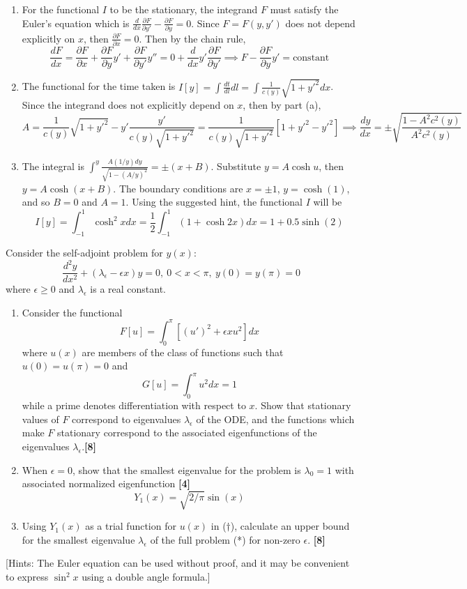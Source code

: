 \documentclass[a4paper]{article}
\begin{document}
\begin{ans}\leavevmode
\begin{enumerate}[label=(\alph*)]
\item For the functional $I$ to be the stationary, the integrand $F$ must satisfy the Euler's equation which is $\frac{d}{dx}\frac{\partial F}{\partial y'}-\frac{\partial F}{\partial y}=0$. Since $F=F(y,y')$ does not depend explicitly on $x$, then $\frac{\partial F}{\partial x}=0$. Then by the chain rule,
$$\frac{dF}{dx}=\frac{\partial F}{\partial x}+\frac{\partial F}{\partial y}y'+\frac{\partial F}{\partial y'}y''=0+\frac{d}{dx}y'\frac{\partial F}{\partial y'}\implies F-\frac{\partial F}{\partial y}y'=\text{constant}$$
\item The functional for the time taken is $I[y]=\int\frac{dt}{dl}dl=\int\frac{1}{c(y)}\sqrt{1+y'^2}dx$. Since the integrand does not explicitly depend on $x$, then by part (a),
$$A=\frac{1}{c(y)}\sqrt{1+y'^2}-y'\frac{y'}{c(y)\sqrt{1+y'^2}}=\frac{1}{c(y)\sqrt{1+y'^2}}[1+y'^2-y'^2]\implies\frac{dy}{dx}=\pm\sqrt{\frac{1-A^2c^2(y)}{A^2c^2(y)}}$$
\item The integral is $\int^y\frac{A(1/y)dy}{\sqrt{1-(A/y)^2}}=\pm(x+B)$.  Substitute $y=A\cosh u$, then $y=A\cosh(x+B)$. The boundary conditions are $x=\pm1$, $y=\cosh(1)$, and so $B=0$ and $A=1$. Using the suggested hint, the functional $I$ will be
$$I[y]=\int_{-1}^1\cosh^2xdx=\frac{1}{2}\int_{-1}^1(1+\cosh 2x)dx=1+0.5\sinh(2)$$
\end{enumerate}
\end{ans}
\newpage
\begin{qns}
Consider the self-adjoint problem for $y(x)$:
\begin{equation}
   \frac{d^2y}{dx^2}+(\lambda_\epsilon-\epsilon x)y=0,~0<x<\pi,~y(0)=y(\pi)=0\tag{*}
\end{equation}
where $\epsilon\geq0$ and $\lambda_\epsilon$ is a real constant.
\begin{enumerate}[label=(\alph*)]
\item Consider the functional
\begin{equation}F[u]=\int_0^\pi[(u')^2+\epsilon xu^2]dx\tag{\dag}
\end{equation}
where $u(x)$ are members of the class of functions such that $u(0)=u(\pi)=0$ and
$$G[u]=\int_0^\pi u^2dx=1$$
while a prime denotes differentiation with respect to $x$. Show that stationary values of $F$ correspond to eigenvalues $\lambda_\epsilon$ of the ODE, and the functions which make $F$ stationary correspond to the associated eigenfunctions of the eigenvalues $\lambda_\epsilon$.\hfill \textbf{[8]}
\item When $\epsilon=0$, show that the smallest eigenvalue for the problem is $\lambda_0=1$ with associated normalized eigenfunction \hfill \textbf{[4]} $$Y_1(x)=\sqrt{2/\pi}\sin(x)$$
\item Using $Y_1(x)$ as a trial function for $u(x)$ in ($\dag$), calculate an upper bound for the smallest eigenvalue $\lambda_\epsilon$ of the full problem (*) for non-zero $\epsilon$. \hfill \textbf{[8]}
\end{enumerate}
[Hints: The Euler equation can be used without proof, and it may be convenient to express $\sin^2 x$ using a double angle formula.]
\end{qns}
\end{document}
